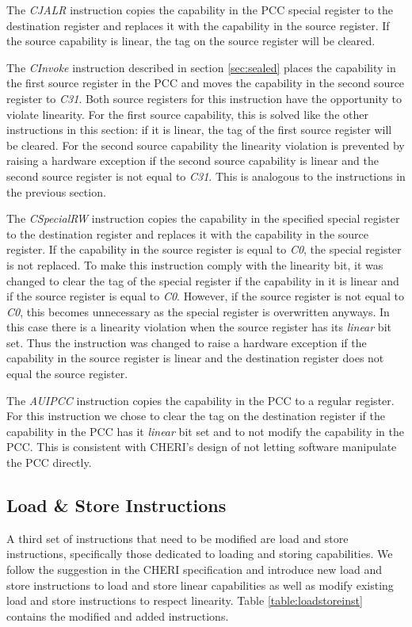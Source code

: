 The \textit{CJALR} instruction copies the capability in the PCC special register to the destination register and replaces it with the capability in the source register. If the source capability is linear, the tag on the source register will be cleared.

The \textit{CInvoke} instruction described in section \ref{sec:sealed} places the capability in the first source register in the PCC and moves the capability in the second source register to \textit{C31}. Both source registers for this instruction have the opportunity to violate linearity. For the first source capability, this is solved like the other instructions in this section: if it is linear, the tag of the first source register will be cleared. For the second source capability the linearity violation is prevented by raising a hardware exception if the second source capability is linear and the second source register is not equal to \textit{C31}. This is analogous to the instructions in the previous section.

The \textit{CSpecialRW} instruction copies the capability in the specified special register to the destination register and replaces it with the capability in the source register. If the capability in the source register is equal to \textit{C0}, the special register is not replaced. To make this instruction comply with the linearity bit, it was changed to clear the tag of the special register if the capability in it is linear and if the source register is equal to \textit{C0}. However, if the source register is not equal to \textit{C0}, this becomes unnecessary as the special register is overwritten anyways. In this case there is a linearity violation when the source register has its \textit{linear} bit set. Thus the instruction was changed to raise a hardware exception if the capability in the source register is linear and the destination register does not equal the source register.

The \textit{AUIPCC} instruction copies the capability in the PCC to a regular register. For this instruction we chose to clear the tag on the destination register if the capability in the PCC has it \textit{linear} bit set and to not modify the capability in the PCC. This is consistent with CHERI's design of not letting software manipulate the PCC directly.

\subsection{Load \& Store Instructions}
A third set of instructions that need to be modified are load and store instructions, specifically those dedicated to loading and storing capabilities. We follow the suggestion in the CHERI specification and introduce new load and store instructions to load and store linear capabilities as well as modify existing load and store instructions to respect linearity. Table \ref{table:loadstoreinst} contains the modified and added instructions.

